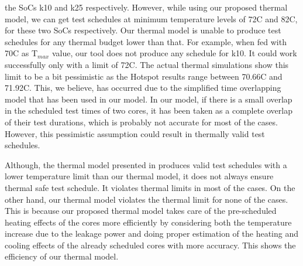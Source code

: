 \documentclass[conference]{IEEEtran}
\begin{document}
the SoCs k10 and k25 respectively. However, while using
our proposed thermal model, we can get test schedules at
minimum temperature levels of 72\degree C and 82\degree C, for these two
SoCs respectively. Our thermal model is unable to produce test
schedules for any thermal budget lower than that. For example,
when fed with 70\degree C as T$_{max}$ value, our tool does not produce
any schedule for k10. It could work successfully only with a
limit of 72\degree C. The actual thermal simulations show this limit
to be a bit pessimistic as the Hotspot results range between
70.66\degree C and 71.92\degree C. This, we believe, has occurred due to
the simplified time overlapping model that has been used in our
model. In our model, if there is a small overlap in the scheduled
test times of two cores, it has been taken as a complete overlap
of their test durations, which is probably not accurate for most
of the cases. However, this pessimistic assumption could result
in thermally valid test schedules.

	\par
	Although, the thermal model presented in \cite{yao2011power} produces
valid test schedules with a lower temperature limit than our
thermal model, it does not always ensure thermal safe test
schedule. It violates thermal limits in most of the cases. On
the other hand, our thermal model violates the thermal limit for
none of the cases. This is because our proposed thermal model
takes care of the pre-scheduled heating effects of the cores
more efficiently by considering both the temperature increase
due to the leakage power and doing proper estimation of the
heating and cooling effects of the already scheduled cores with
more accuracy. This shows the efficiency of our thermal model.
\end{document}
